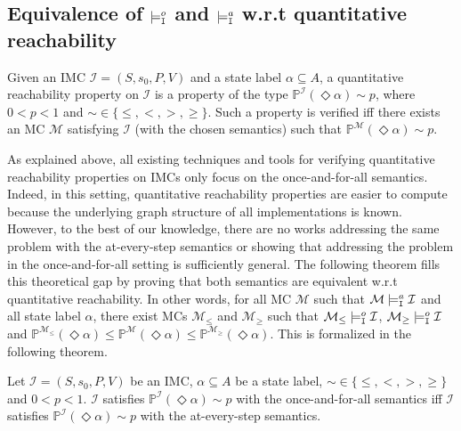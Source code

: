 \documentclass{llncs}
\newcommand{\mc}{\textnormal{MC}}
\newcommand{\imc}{\textnormal{IMC}}
\newcommand{\satisfactionImcOnce}{\ensuremath{\models^{o}_{\tt{I}}}}
\newcommand{\satisfactionImc}{\ensuremath{\models^{a}_{\tt{I}}}}
\newcommand{\ltlExists}{\ensuremath{\Diamond}}
\newcommand{\toedit}[1]{{\color{red}#1}}
\begin{document}

\subsection{Equivalence of $\satisfactionImcOnce$ and
  $\satisfactionImc$ w.r.t quantitative reachability}\label{sec:equiv_imc_semantics}


Given an {\imc} $\mathcal{I} = (S,s_0,P,V)$ and a state label
$\alpha \subseteq A$, a quantitative reachability property on
$\mathcal{I}$ is a property of the type
$\mathbb{P}^{\mathcal{I}}(\ltlExists \alpha) {\sim} p$, where
$0<p<1$ and ${\sim} \in \{\le, <, >, \ge\}$. Such a property is
verified iff there exists an {\mc} $\mathcal{M}$ satisfying $\mathcal{I}$ (with the chosen semantics) such that
$\mathbb{P}^{\mathcal{M}}(\ltlExists \alpha) {\sim} p$.

As explained above, all existing techniques and tools for verifying
quantitative reachability properties on {\imc}s only focus on the
once-and-for-all semantics. Indeed, in this setting, quantitative
reachability properties are easier to compute because the underlying
graph structure of all implementations is known. However, to the best
of our knowledge, there are no works addressing the same problem with
the at-every-step semantics or showing that addressing the problem in
the once-and-for-all setting is sufficiently general. The following
theorem fills this theoretical gap by proving that both semantics are
equivalent w.r.t quantitative reachability. In other words, for all
{\mc} $\mathcal{M}$ such that $\mathcal{M} \satisfactionImc
\mathcal{I}$ and all state label $\alpha$, there exist {\mc}s
$\mathcal{M}_\le$ and $\mathcal{M}_{\ge}$ such that $\mathcal{M}_{\le}
\satisfactionImcOnce \mathcal{I}$, $\mathcal{M}_{\ge}
\satisfactionImcOnce \mathcal{I}$ and
$\mathbb{P}^{\mathcal{M}_{\le}}(\ltlExists \alpha) \le
\mathbb{P}^{\mathcal{M}}(\ltlExists \alpha) \le
\mathbb{P}^{\mathcal{M_{\ge}}}(\ltlExists \alpha)$. This is
formalized in the following theorem.



\begin{theorem}\label{thm:reachability-semantics-equivalence-imcs}
	Let $\mathcal{I} = (S,s_0,P,V)$ be an {\imc}, $\alpha
        \subseteq A$ be a state label, ${\sim} \in \{\le,<,>,\ge\}$
        and $0<p<1$. $\mathcal{I}$ satisfies
        $\mathbb{P}^{\mathcal{I}}(\ltlExists \alpha) {\sim} p$ with
        the once-and-for-all semantics iff $\mathcal{I}$ satisfies
        $\mathbb{P}^{\mathcal{I}}(\ltlExists \alpha) {\sim} p$ with
        the at-every-step semantics.
\end{theorem}
\end{document}
